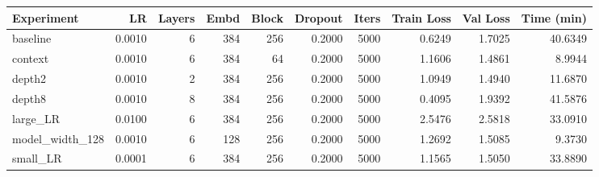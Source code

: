 \begin{tabular}{lrrrrrrrrr}
\toprule
Experiment & LR & Layers & Embd & Block & Dropout & Iters & Train Loss & Val Loss & Time (min) \\
\midrule
baseline & 0.0010 & 6 & 384 & 256 & 0.2000 & 5000 & 0.6249 & 1.7025 & 40.6349 \\
context & 0.0010 & 6 & 384 & 64 & 0.2000 & 5000 & 1.1606 & 1.4861 & 8.9944 \\
depth2 & 0.0010 & 2 & 384 & 256 & 0.2000 & 5000 & 1.0949 & 1.4940 & 11.6870 \\
depth8 & 0.0010 & 8 & 384 & 256 & 0.2000 & 5000 & 0.4095 & 1.9392 & 41.5876 \\
large_LR & 0.0100 & 6 & 384 & 256 & 0.2000 & 5000 & 2.5476 & 2.5818 & 33.0910 \\
model_width_128 & 0.0010 & 6 & 128 & 256 & 0.2000 & 5000 & 1.2692 & 1.5085 & 9.3730 \\
small_LR & 0.0001 & 6 & 384 & 256 & 0.2000 & 5000 & 1.1565 & 1.5050 & 33.8890 \\
\bottomrule
\end{tabular}
